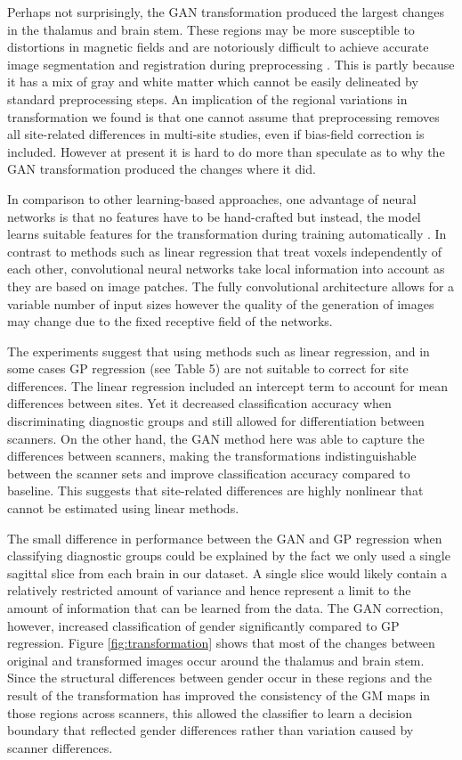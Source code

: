 Perhaps not surprisingly, the GAN transformation produced the largest changes in the thalamus and brain stem. These regions may be more susceptible to distortions in magnetic fields and are notoriously difficult to achieve accurate image segmentation and registration during preprocessing \citep{good2001cerebral}. This is partly because it has a mix of gray and white matter which cannot be easily delineated by standard preprocessing steps. An implication of the regional variations in transformation we found is that one cannot assume that preprocessing removes all site-related differences in multi-site studies, even if bias-field correction is included. However at present it is hard to do more than speculate as to why the GAN transformation produced the changes where it did.

In comparison to other learning-based approaches, one advantage of neural networks is that no features have to be hand-crafted but instead, the model learns suitable features for the transformation during training automatically \citep{plis2014deep}. In contrast to methods such as linear regression that treat voxels independently of each other, convolutional neural networks take local information into account as they are based on image patches. The fully convolutional architecture allows for a variable number of input sizes however the quality of the generation of images may change due to the fixed receptive field of the networks.

The experiments suggest that using methods such as linear regression, and in some cases GP regression (see Table 5) are not suitable to correct for site differences. The linear regression included an intercept term to account for mean differences between sites. Yet it decreased classification accuracy when discriminating diagnostic groups and still allowed for differentiation between scanners.  On the other hand, the GAN method here was able to capture the differences between scanners, making the transformations indistinguishable between the scanner sets and improve classification accuracy compared to baseline. This suggests that site-related differences are highly nonlinear that cannot be estimated using linear methods.

The small difference in performance between the GAN and GP regression when classifying diagnostic groups could be explained by the fact we only used a single sagittal slice from each brain in our dataset. A single slice would likely contain a relatively restricted amount of variance and hence represent a limit to the amount of information that can be learned from the data. The GAN correction, however, increased classification of gender significantly compared to GP regression. Figure \ref{fig:transformation} shows that most of the changes between original and transformed images occur around the thalamus and brain stem. Since the structural differences between gender occur in these regions \citep{ruigrok2014meta} and the result of the transformation has improved the consistency of the GM maps in those regions across scanners, this allowed the classifier to learn a decision boundary that reflected gender differences rather than variation caused by scanner differences.

